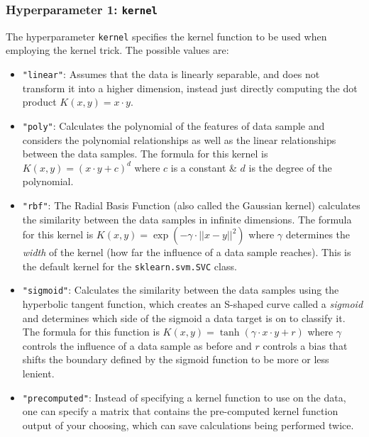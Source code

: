 \documentclass[a4paper, 10pt]{article}
\begin{document}
\subsubsection{Hyperparameter 1: \texttt{kernel}}
The hyperparameter \texttt{kernel} specifies the kernel function to be used when employing the kernel trick.
The possible values are:\supercite{scikit_kernel}
\begin{itemize}
    \item   \texttt{"linear"}: Assumes that the data is linearly separable, and does not transform it into a higher dimension, instead just directly computing the dot product $K(x,y) = x \cdot y$.

    \item   \texttt{"poly"}: Calculates the polynomial of the features of data sample and considers the polynomial relationships as well as the linear relationships between the data samples.
            The formula for this kernel is $K(x,y) = (x \cdot y + c)^d$ where $c$ is a constant \& $d$ is the degree of the polynomial.

    \item   \texttt{"rbf"}: The Radial Basis Function (also called the Gaussian kernel) calculates the similarity between the data samples in infinite dimensions.
            The formula for this kernel is $K(x, y) = \exp(- \gamma \cdot || x - y ||^2)$ where $\gamma$ determines the \textit{width} of the kernel (how far the influence of a data sample reaches).
            This is the default kernel for the \texttt{sklearn.svm.SVC} class.

    \item   \texttt{"sigmoid"}: Calculates the similarity between the data samples using the hyperbolic tangent function, which creates an S-shaped curve called a \textit{sigmoid} and determines which side of the sigmoid a data target is on to classify it.
            The formula for this function is $K(x,y) = \tanh (\gamma \cdot x \cdot y + r)$ where $\gamma$ controls the influence of a data sample as before and $r$ controls a bias that shifts the boundary defined by the sigmoid function to be more or less lenient.

    \item   \texttt{"precomputed"}: Instead of specifying a kernel function to use on the data, one can specify a matrix that contains the pre-computed kernel function output of your choosing, which can save calculations being performed twice.
\end{itemize}
\end{document}
